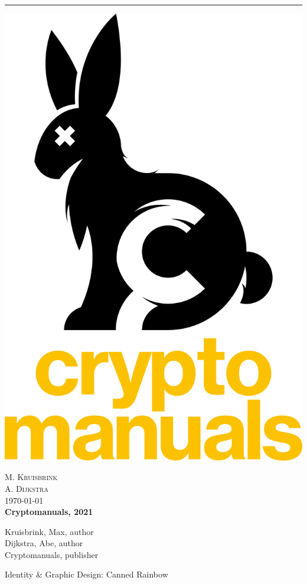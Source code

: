 \begin{titlepage} %


\pagestyle{empty}
    
    \centering%
    
	\rule{1pt}{.9\textheight} %
	\hspace{0.05\textwidth} %
	\parbox[b]{0.85\textwidth}{ %
		
		\includegraphics[width=.3\textwidth]{logo/CRYPTO_M_PORT_1_BUNNY_B+TXT_LOGO_POS_RGB.png}
		
		\vspace{1cm}
			
		{\large\textsc{M. Kruisbrink}}\\ %
		{\large\textsc{A. Dijkstra}}\\[1\baselineskip] %
		\vspace{0.1\textheight} %
		{\today}\\
	
		
			\large{\textbf{Cryptomanuals, 2021}}\\
			
			\vspace{.3cm}
			
            \small{Kruisbrink, Max, author\\ Dijkstra, Abe, author\\ Cryptomanuals, publisher}
            
            \vspace{.3cm}
			\small{Identity \& Graphic Design: Canned Rainbow}\\
			
}
\end{titlepage}
